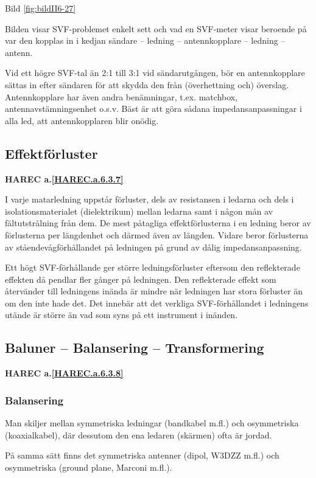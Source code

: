 Bild \ref{fig:bildII6-27}

Bilden visar SVF-problemet enkelt sett och vad en SVF-meter visar
beroende på var den kopplas in i kedjan sändare -- ledning --
antennkopplare -- ledning -- antenn.

Vid ett högre SVF-tal än 2:1 till 3:1 vid sändarutgången, bör en
antennkopplare sättas in efter sändaren för att skydda den från
(överhettning och) överslag. Antennkopplare har även andra
benämningar, t.ex. matchbox, antennavstämningsenhet o.s.v. Bäst är att
göra sådana impedansanpassningar i alla led, att antennkopplaren blir
onödig.

\subsection{Effektförluster}
\textbf{
HAREC a.\ref{HAREC.a.6.3.7}\label{myHAREC.a.6.3.7}
}

I varje matarledning uppstår förluster, dels av resistansen i ledarna
och dels i isolationsmaterialet (dielektrikum) mellan ledarna samt i
någon mån av fältutstrålning från dem. De mest påtagliga
effektförlusterna i en ledning beror av förlusterna per längdenhet och
därmed även av längden. Vidare beror förlusterna av
ståendevågförhållandet på ledningen på grund av dålig
impedansanpassning.

Ett högt SVF-förhållande ger större ledningsförluster eftersom den
reflekterade effekten då pendlar fler gånger på ledningen.  Den
reflekterade effekt som återvänder till ledningens inända är mindre
när ledningen har stora förluster än om den inte hade det.  Det
innebär att det verkliga SVF-förhållandet i ledningens utände är
större än vad som syns på ett instrument i inänden.

\subsection{Baluner -- Balansering -- Transformering}
\textbf{
HAREC a.\ref{HAREC.a.6.3.8}\label{myHAREC.a.6.3.8}
}

\subsubsection{Balansering}

Man skiljer mellan symmetriska ledningar (bandkabel m.fl.) och
osymmetriska (koaxialkabel), där dessutom den ena ledaren (skärmen)
ofta är jordad.

På samma sätt finns det symmetriska antenner (dipol, W3DZZ m.fl.) och
osymmetriska (ground plane, Marconi m.fl.).

